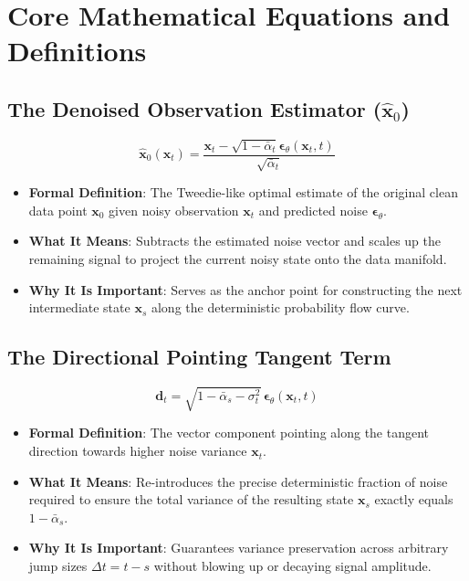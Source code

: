 \documentclass[11pt,a4paper]{article}
\theoremstyle{definition}
\begin{document}
\section{Core Mathematical Equations and Definitions}

\subsection{The Denoised Observation Estimator ($\hat{\mathbf{x}}_0$)}
{\boldmath
\begin{equation}
\hat{\mathbf{x}}_0(\mathbf{x}_t) = \frac{\mathbf{x}_t - \sqrt{1 - \bar{\alpha}_t}\boldsymbol{\epsilon}_\theta(\mathbf{x}_t, t)}{\sqrt{\bar{\alpha}_t}}
\end{equation}
}
\begin{itemize}
    \item \textbf{Formal Definition}: The Tweedie-like optimal estimate of the original clean data point $\mathbf{x}_0$ given noisy observation $\mathbf{x}_t$ and predicted noise $\boldsymbol{\epsilon}_\theta$.
    \item \textbf{What It Means}: Subtracts the estimated noise vector and scales up the remaining signal to project the current noisy state onto the data manifold.
    \item \textbf{Why It Is Important}: Serves as the anchor point for constructing the next intermediate state $\mathbf{x}_s$ along the deterministic probability flow curve.
\end{itemize}

\subsection{The Directional Pointing Tangent Term}
{\boldmath
\begin{equation}
\mathbf{d}_t = \sqrt{1 - \bar{\alpha}_s - \sigma_t^2} \, \boldsymbol{\epsilon}_\theta(\mathbf{x}_t, t)
\end{equation}
}
\begin{itemize}
    \item \textbf{Formal Definition}: The vector component pointing along the tangent direction towards higher noise variance $\mathbf{x}_t$.
    \item \textbf{What It Means}: Re-introduces the precise deterministic fraction of noise required to ensure the total variance of the resulting state $\mathbf{x}_s$ exactly equals $1 - \bar{\alpha}_s$.
    \item \textbf{Why It Is Important}: Guarantees variance preservation across arbitrary jump sizes $\Delta t = t - s$ without blowing up or decaying signal amplitude.
\end{itemize}
\end{document}
